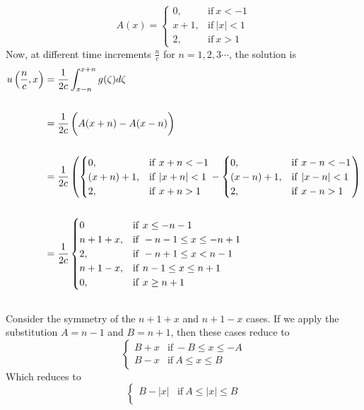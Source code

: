 \documentclass[12pt]{article}
\begin{document}
\begin{enumerate}[(a)]
{$$A(x) =
\begin{cases}
	0, & \mathrm{if} \ x < -1 \\ 
	x + 1, & \mathrm{if} \ |x| < 1 \\ 
	2, & \mathrm{if} \ x > 1
\end{cases}$$
Now, at different time increments $\frac{n}{c}$ for $n=1,2,3\cdots$, the solution is
\[
\begin{aligned}
u\left( \frac{n}{c}, x \right) &= \frac{1}{2c}  \int_{x-n}^{x+n} g(\zeta) d\zeta \\ \\
&= \frac{1}{2c} \left(\vphantom{\frac12}A(x+n) - A(x-n)\right) \\ \\
&= \frac{1}{2c} \left( \begin{cases}
	0, & \mathrm{if} \ x+n < -1 \\ 
	(x+n) + 1, & \mathrm{if} \ |x+n| < 1 \\ 
	2, & \mathrm{if} \ x+n > 1
\end{cases} - 
\begin{cases}
	0, & \mathrm{if} \ x-n < -1 \\ 
	(x-n) + 1, & \mathrm{if} \ |x-n| < 1 \\ 
	2, & \mathrm{if} \ x-n > 1
\end{cases}
 \right) \\ \\
&= \frac{1}{2c} \begin{cases}
	0 & \mathrm{if} \ x \leq -n-1 \\ 
	n+1+x, & \mathrm{if} \ -n -1 \leq x \leq -n + 1 \\
	2, & \mathrm{if} \ -n+1 \leq x < n-1 \\
	n+1 -x, & \mathrm{if} \ n - 1 \leq x \leq n + 1 \\
	0, & \mathrm{if} \ x \geq n + 1 \\ 
\end{cases} \\ \\
\end{aligned}
\]
Consider the symmetry of the $n+1+x$ and $n+1-x$ cases. If we apply the substitution $A = n-1$ and $B=n+1$, then these cases reduce to $$
\begin{cases}
B + x & \mathrm{if} \ -B \leq x \leq -A  \\
B - x & \mathrm{if} \ A \leq x \leq B
\end{cases}$$
Which reduces to $$
\begin{cases}
B - |x| & \mathrm{if} \ A \leq |x| \leq B  \\

\end{cases}$$}
\end{enumerate}
\end{document}
